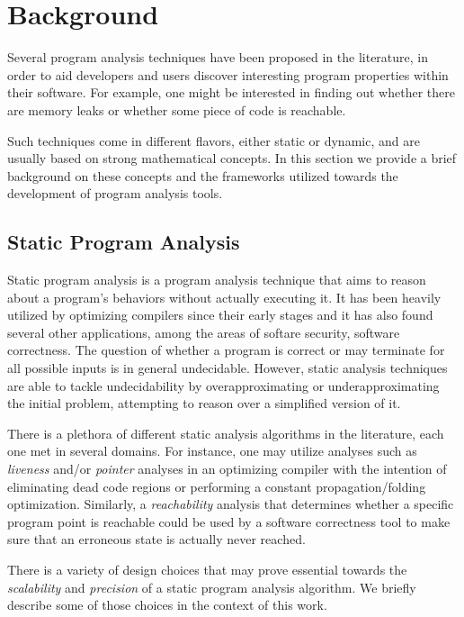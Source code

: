 
\chapter{Background}\label{c:background}

Several program analysis techniques have been proposed in the literature, in
order to aid developers and users discover interesting program properties within
their software. For example, one might be interested in finding out whether
there are memory leaks or whether some piece of code is reachable.

Such techniques come in different flavors, either static or dynamic, and are
usually based on strong mathematical concepts. In this section we provide
a brief background on these concepts and the frameworks utilized towards
the development of program analysis tools.

\section{Static Program Analysis}

Static program analysis is a program analysis technique that aims to reason
about a program's behaviors without actually executing it. It has been
heavily utilized by optimizing compilers since their early stages and it
has also found several other applications, among the areas of softare security,
software correctness\cite{spa}. The question of whether
a program is correct or may terminate for all possible inputs is in general
undecidable. However, static analysis techniques are able to tackle
undecidability by overapproximating or underapproximating the initial problem,
attempting to reason over a simplified version of it.

%
%

There is a plethora of different static analysis algorithms in the literature, each one
met in several domains. For instance, one may utilize analyses such as \emph{liveness} and/or
\emph{pointer} analyses in an optimizing compiler with the intention of eliminating
dead code regions or performing a constant propagation/folding optimization.
Similarly, a \emph{reachability} analysis that determines whether a specific program point is
reachable could be used by a software correctness tool to make sure that
an erroneous state is actually never reached.

There is a variety of design choices that may prove essential towards the \emph{scalability}
and \emph{precision} of a static program analysis algorithm. We briefly describe some of
those choices in the context of this work.

